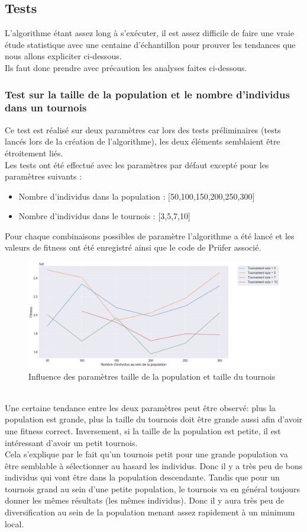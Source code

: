 \documentclass{article} %
\begin{document}
\subsection{Tests}
L'algorithme étant assez long à s'exécuter, il est assez difficile de faire une vraie étude statistique avec une centaine d'échantillon pour prouver les tendances que nous allons expliciter ci-dessous.\\
Ils faut donc prendre avec précaution les analyses faites ci-dessous.

\subsubsection{Test sur la taille de la population et le nombre d'individus dans un tournois }
Ce test est réalisé sur deux paramètres car lors des tests préliminaires (tests lancés lors de la création de l'algorithme), les deux éléments semblaient être étroitement liés.\\
Les tests ont été effectué avec les paramètres par défaut excepté pour les paramètres suivants :
\begin{itemize}
	\item Nombre d'individus dans la population : [50,100,150,200,250,300]
	\item Nombre d'individus dans le tournois : [3,5,7,10]
\end{itemize}
Pour chaque combinaisons possibles de paramètre l'algorithme a été lancé et les valeurs de fitness ont été enregistré ainsi que le code de Prüfer associé.\\
\begin{figure}[!h]
	\centering
	\includegraphics[keepaspectratio = true,scale=0.65]{tournAndPop.png}
	\caption{Influence des paramètres taille de la population et taille du tournois}
\end{figure}
~\\
Une certaine tendance entre les deux paramètres peut être observé: plus la population est grande, plus la taille du tournois doit être grande aussi afin d'avoir une fitness correct. Inversement, si la taille de la population est petite, il est intéressant d'avoir un petit tournois.\\
Cela s'explique par le fait qu'un tournois petit pour une grande population va être semblable à sélectionner au hasard les individus. Donc il y a très peu de bons individus qui vont être dans la population descendante. Tandis que pour un tournois grand au sein d'une petite population, le tournois va en général toujours donner les mêmes résultats (les mêmes individus). Donc il y aura très peu de diversification au sein de la population menant assez rapidement à un minimum local.\\
\end{document}
